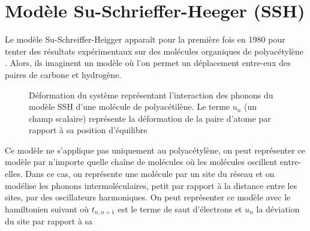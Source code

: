 \section{Modèle Su-Schrieffer-Heeger (SSH)}
Le modèle Su-Schreiffer-Heigger apparaît pour la première fois en 1980
\cite{susoliton1980} pour tenter des résultats expérimentaux sur des
molécules organiques de polyacétylène \cite{goldberg-electron-1979}.
Alors, ils imaginent un modèle où l'on permet un déplacement entre-eux
des paires de carbone et hydrogène.
\begin{figure}[H]
    \centering
    \caption{Déformation du système représentant l'interaction des phonons
    du modèle SSH d'une molécule de polyacétilène. Le terme $u_n$ (un champ
    scalaire) représente la déformation de la paire d'atome par rapport à
    sa position d'équilibre}
\end{figure}
Ce modèle ne s'applique pas uniquement au polyacétylène, on peut
représenter ce modèle par n'importe quelle chaîne de molécules où les
molécules oscillent entre-elles. Dans ce cas, on représente une molécule
par un site du réseau et on modélise les phonons intermoléculaires, petit
par rapport à la distance entre les sites, par des oscillateurs harmoniques.
On peut représenter ce modèle avec le hamiltonien suivant où $t_{n,n+1}$ est
le terme de saut d'électrons et $u_n$ la déviation du site par rapport à sa
